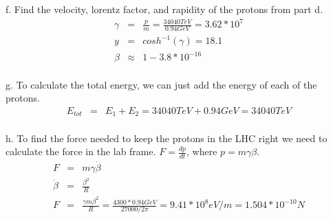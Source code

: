 \documentclass[11pt]{amsart}
\begin{document}
f. Find the velocity, lorentz factor, and rapidity of the protons from part d. \\
\begin{eqnarray*}
\gamma &=& \frac{p}{m} = \frac{34040TeV}{0.94GeV} = 3.62*10^{7} \\
y &=& cosh^{-1}(\gamma) = 18.1 \\
\beta &\approx& 1-3.8*10^{-16} 
\end{eqnarray*} \\
g. To calculate the total energy, we can just add the energy of each of the protons. \\
\begin{eqnarray*}
E_{tot} &=& E_{1}+E_{2} = 34040TeV+0.94GeV = 34040TeV
\end{eqnarray*} \\
h. To find the force needed to keep the protons in the LHC right we need to calculate the force in the lab frame. $F=\frac{dp}{dt}$, where $p=m\gamma\beta$. \\
\begin{eqnarray*} 
F &=& m\gamma\dot{\beta} \\
\dot{\beta} &=& \frac{\beta^{2}}{R} \\
F &=& \frac{\gamma{m}\beta^{2}}{R}  = \frac{4300*0.94GeV}{27000/2\pi} = 9.41*10^{8}eV/m  = 1.504*10^{-10} N
\end{eqnarray*} \\
\end{document}
